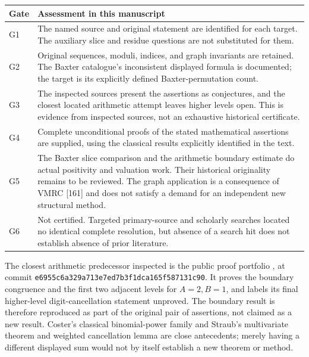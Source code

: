 \documentclass[11pt,a4paper]{article}
\theoremstyle{remark}\newtheorem{remark}[theorem]{Remark}
\numberwithin{equation}{section}
\begin{document}
\begin{center}\small
\begin{tabular}{@{}p{}p{}@{}}
\toprule
Gate & Assessment in this manuscript\\\midrule
G1 & The named source and original statement are identified for each target.
The auxiliary slice and residue questions are not substituted for them.\\[3pt]
G2 & Original sequences, moduli, indices, and graph invariants are retained.
The Baxter catalogue's inconsistent displayed formula is documented;
the target is its explicitly defined Baxter-permutation count.\\[3pt]
G3 & The inspected sources present the assertions as conjectures, and the
closest located arithmetic attempt leaves higher levels open. This is
evidence from inspected sources, not an exhaustive historical certificate.\\[3pt]
G4 & Complete unconditional proofs of the stated mathematical assertions
are supplied, using the classical results explicitly identified in the text.\\[3pt]
G5 & The Baxter slice comparison and the arithmetic boundary estimate do
actual positivity and valuation work. Their historical originality remains
to be reviewed. The graph application is a consequence of VMRC [161]
and does not satisfy a demand for an independent new structural method.\\[3pt]
G6 & Not certified. Targeted primary-source and scholarly searches located
no identical complete resolution, but absence of a search hit does not
establish absence of prior literature.\\\bottomrule
\end{tabular}
\end{center}

The closest arithmetic predecessor inspected is the public proof portfolio
\cite{A:Bajaj}, at commit
\texttt{e6955c6a329a713e7ed7b3f1dca165f587131c90}.
It proves the boundary congruence and the first two adjacent levels for
$A=2,B=1$, and labels its final higher-level digit-cancellation statement
unproved. The boundary result is therefore reproduced as part of the
original pair of assertions, not claimed as a new result.
Coster's classical binomial-power family \cite{Coster} and Straub's
multivariate theorem and weighted cancellation lemma \cite{A:Straub}
are close antecedents; merely having a different displayed sum would not
by itself establish a new theorem or method.
\end{document}
